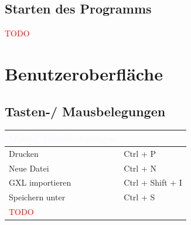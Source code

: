 \documentclass[enabledeprecatedfontcommands,fontsize=11pt,paper=a4,twoside]{scrartcl}
\newcommand*{\red}{\textcolor{red}}
\begin{document}
\subsection{Starten des Programms}
\red{TODO}

\newpage	
\section{Benutzeroberfläche}
\subsection{Tasten-/ Mausbelegungen}

\begin{tabular} {|p{8cm}|p{8cm}|}
	\hline
	\rowcolor{glaucous}\multicolumn{2}{|l|} {\parbox{16cm}{\textbf{\textcolor{ghostwhite}{Maus-/ Tastenbelegungen}}} } \\ \hline\hline 	
	Drucken	& Ctrl + P \\ \hline
	Neue Datei	& Ctrl + N \\ \hline
	GXL importieren	& Ctrl + Shift + I \\ \hline
	Speichern unter	&	Ctrl + S \\ \hline
	\red{TODO} & \\ \hline
\end{tabular}

 
\end{document}
